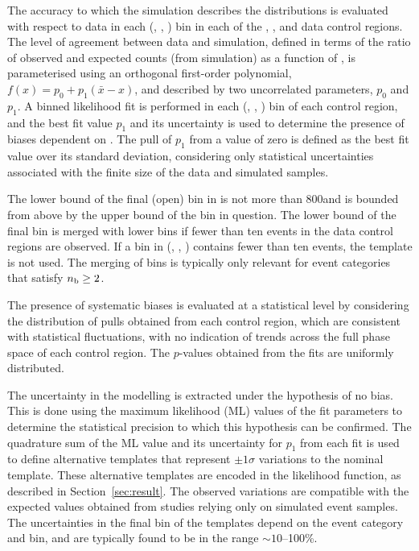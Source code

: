 The accuracy to which the simulation describes the \HTmiss
distributions is evaluated with respect to data in each (\njet, \nb,
\scalht) bin in each of the \mj, \mmj, and \gj data control regions. %
The level of agreement between data and simulation, defined in terms
of the ratio of observed and expected counts (from simulation) as a
function of \HTmiss, is parameterised using an orthogonal first-order
polynomial, $f(x) = p_0 + p_1(\bar{x}-x)$, and described by two
uncorrelated parameters, $p_0$ and $p_1$. A binned likelihood fit is
performed in each (\njet, \nb, \scalht) bin of each control region,
and the best fit value $p_1$ and its uncertainty is used to determine
the presence of biases dependent on \HTmiss. The pull of $p_1$ from a
value of zero is defined as the best fit value over its standard
deviation, considering only statistical uncertainties associated with
the finite size of the data and simulated samples.

The lower bound of the final (open) bin in \HTmiss is not more than
800\GeV and is bounded from above by the upper bound of the \scalht
bin in question. The lower bound of the final \HTmiss bin is merged
with lower bins if fewer than ten events in the data control regions
are observed. If a bin in (\njet, \nb, \scalht) contains fewer than ten
events, the \HTmiss template is not used. The merging of bins is
typically only relevant for event categories that satisfy $n_{\text{b}} \geq
2$.

The presence of systematic biases is evaluated at a statistical level
by considering the distribution of pulls obtained from each control
region, which are consistent with statistical fluctuations, with no
indication of trends across the full phase space of each control
region. The $p$-values obtained from the fits are uniformly
distributed.

The uncertainty in the \HTmiss modelling is extracted under the
hypothesis of no bias. This is done using the maximum likelihood (ML)
values of the fit parameters to determine the statistical precision to
which this hypothesis can be confirmed. The quadrature sum of the ML
value and its uncertainty for $p_1$ from each fit is used to define
alternative templates that represent $\pm1\sigma$ variations to the
nominal \HTmiss template. These alternative templates are encoded in
the likelihood function, as described in Section~\ref{sec:result}. The
observed variations are compatible with the expected values obtained
from studies relying only on simulated event samples. The
uncertainties in the final \HTmiss bin of the templates depend on the
event category and \scalht bin, and are typically found to be in the
range $\sim 10$--100\%.

